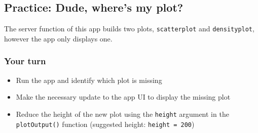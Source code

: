 \documentclass[
  letterpaper,
  DIV=11,
  numbers=noendperiod]{scrreprt}
\newenvironment{Shaded}{\begin{snugshade}}{\end{snugshade}}
\newcommand{\AttributeTok}[1]{\textcolor[rgb]{0.40,0.46,0.14}{#1}}
\newcommand{\CommentTok}[1]{\textcolor[rgb]{0.37,0.37,0.37}{#1}}
\newcommand{\ControlFlowTok}[1]{\textcolor[rgb]{0.00,0.46,0.62}{#1}}
\newcommand{\FunctionTok}[1]{\textcolor[rgb]{0.28,0.35,0.67}{#1}}
\newcommand{\NormalTok}[1]{\textcolor[rgb]{0.00,0.46,0.62}{#1}}
\newcommand{\OtherTok}[1]{\textcolor[rgb]{0.00,0.46,0.62}{#1}}
\newcommand{\SpecialCharTok}[1]{\textcolor[rgb]{0.37,0.37,0.37}{#1}}
\newcommand{\StringTok}[1]{\textcolor[rgb]{0.13,0.47,0.30}{#1}}
\providecommand{\tightlist}{%
  \setlength{\itemsep}{0pt}\setlength{\parskip}{0pt}}
\begin{document}
\begin{Shaded}
\end{Shaded}

\hypertarget{practice-dude-wheres-my-plot}{%
\subsection{Practice: Dude, where's my
plot?}\label{practice-dude-wheres-my-plot}}

The server function of this app builds two plots, \texttt{scatterplot}
and \texttt{densityplot}, however the app only displays one.

\hypertarget{your-turn-5}{%
\subsubsection{Your turn}\label{your-turn-5}}

\begin{itemize}
\tightlist
\item
  Run the app and identify which plot is missing
\item
  Make the necessary update to the app UI to display the missing plot
\item
  Reduce the height of the new plot using the \texttt{height} argument
  in the \texttt{plotOutput()} function (suggested height:
  \texttt{height\ =\ 200})
\end{itemize}
\end{document}
